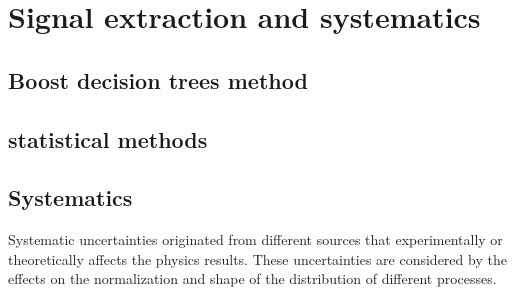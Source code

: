 %
%
%
%
%
%
%
%
%
%

%
%

\chapter{Signal extraction and systematics}

\section{Boost decision trees method} \label{BDTchaper}

\section{statistical methods}

\section{Systematics}
Systematic uncertainties originated from different sources that experimentally or theoretically affects the physics results. These uncertainties are considered by the effects on the normalization and shape of the distribution of different processes. 


